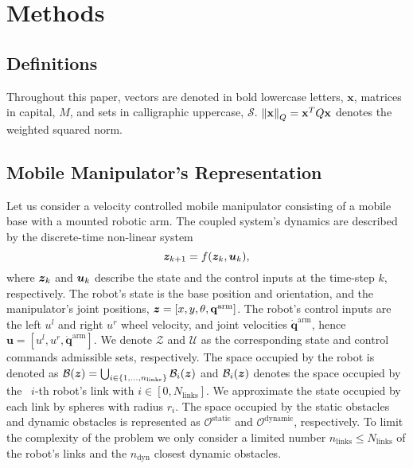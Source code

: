 \section{Methods}%
\label{sec:methods}

\subsection{Definitions}%
\label{sub:general_definitions}
%
Throughout this paper, vectors are denoted in bold lowercase letters, $\mathbf{x}$, matrices in capital, $ M $, and sets in calligraphic uppercase, $\mathcal{S}$.  $\left\lVert\mathbf{x}\right\rVert_Q = \mathbf{x}^TQ\mathbf{x}$ denotes the weighted squared norm.


\subsection{Mobile Manipulator's Representation}

Let us consider a velocity controlled mobile manipulator consisting of a mobile base with a mounted robotic arm. The coupled system's dynamics are described by the discrete-time non-linear system
\begin{equation}
  \bm{z}_{k+1} = f(\bm{z}_k, \bm{u}_k), 
\end{equation}
where $\bm{z}_k$ and $\bm{u}_k$ describe the state and the control inputs at the time-step $k$, respectively. The robot's state is the base position and orientation, and the manipulator's joint positions, $\bm{z} = [x,y,\theta,\mathbf{q}^{\textrm{arm}}]$. The robot's control inputs are the left $u^l$ and right $u^r$ wheel velocity, and joint velocities $\dot{\mathbf{q}}^{\textrm{arm}}$, hence $\mathbf{u}=[u^l,u^r,\dot{\mathbf{q}}^{\textrm{arm}}]$.  We denote $\mathcal{Z}$ and $\mathcal{U}$ as the corresponding state and control commands admissible sets, respectively.
The space occupied by the robot is denoted as $\mathcal{B}(\bm{z})=\bigcup_{i \in \{1,\dots,n_{\textrm{links}} \}}\mathcal{B}_i(\bm{z})$ and $\mathcal{B}_i(\bm{z})$ denotes the space occupied by the ~{$i$-th} robot's link with $i\in[0,N_{\textrm{links}}]$. We approximate the state occupied by each link by spheres with radius $r_i$. The space occupied by the static obstacles and dynamic obstacles is represented as $\mathcal{O}^{\textrm{static}}$ and $\mathcal{O}^{\textrm{dynamic}}$, respectively. To limit the complexity of the problem we only consider a limited number $n_{\textrm{links}} \le N_{\textrm{links}}$ of the robot's links and the $n_{\textrm{dyn}} $ closest dynamic obstacles.

